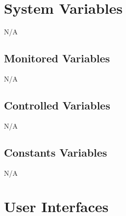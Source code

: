 \documentclass[12pt, titlepage]{article}
\begin{document}
	\section{System Variables}
	
	N/A
	
	\subsection{Monitored Variables}
	N/A
	\subsection{Controlled Variables}
	N/A
	\subsection{Constants Variables}
	N/A
	\section{User Interfaces}
	
\end{document}
